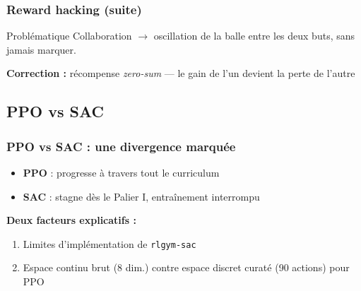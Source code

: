 \documentclass{beamer}
\begin{document}
\begin{frame}
\frametitle{Reward hacking (suite)}

\begin{beamerboxesrounded}[scheme=madrid]{Problématique}
Collaboration $\rightarrow$ oscillation de la balle entre les deux
buts, sans jamais marquer.
\end{beamerboxesrounded}

\vspace{0.3cm}

\pause

\textbf{Correction :} récompense \emph{zero-sum} — le gain de l'un
devient la perte de l'autre \nocite{littmanMarkovGamesFramework1994}


\end{frame}

\subsection{PPO vs SAC}
\begin{frame}
\frametitle{PPO vs SAC : une divergence marquée}

\begin{itemize}
    \item \textbf{PPO} : progresse à travers tout le curriculum
    \item \textbf{SAC} : stagne dès le Palier I, entraînement interrompu
\end{itemize}

\vspace{0.5cm}

\textbf{Deux facteurs explicatifs :}
\begin{enumerate}
    \item Limites d'implémentation de \texttt{rlgym-sac}
    \item Espace continu brut (8 dim.) contre espace discret curaté
    (90 actions) pour PPO
\end{enumerate}

\end{frame}
\end{document}
